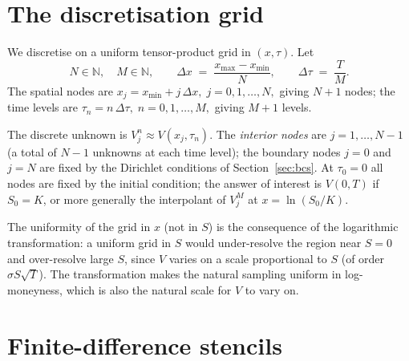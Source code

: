 \documentclass[11pt,a4paper]{article}
\begin{document}
\section{The discretisation grid}

We discretise on a uniform tensor-product grid in $(x, \tau)$. Let
\begin{equation}
N \in \mathbb{N},\quad M \in \mathbb{N},\qquad
\Delta x \;=\; \frac{x_{\max} - x_{\min}}{N},\qquad
\Delta \tau \;=\; \frac{T}{M}.
\label{eq:grid-spacing}
\end{equation}
The spatial nodes are
\(
x_j = x_{\min} + j\,\Delta x,\; j = 0, 1, \dots, N,
\)
giving $N+1$ nodes; the time levels are
\(
\tau_n = n\,\Delta \tau,\; n = 0, 1, \dots, M,
\)
giving $M+1$ levels.

The discrete unknown is $V_j^n \approx V(x_j, \tau_n)$. The
\emph{interior nodes} are $j = 1, \dots, N-1$ (a total of $N-1$
unknowns at each time level); the boundary nodes $j = 0$ and $j = N$
are fixed by the Dirichlet conditions of Section~\ref{sec:bcs}. At
$\tau_0 = 0$ all nodes are fixed by the initial condition; the answer
of interest is $V(0, T)$ if $S_0 = K$, or more generally the
interpolant of $V_j^M$ at $x = \ln(S_0/K)$.

The uniformity of the grid in $x$ (not in $S$) is the consequence of
the logarithmic transformation: a uniform grid in $S$ would
under-resolve the region near $S = 0$ and over-resolve large $S$,
since $V$ varies on a scale proportional to $S$ (of order
$\sigma S\sqrt{T}$).
The transformation makes the natural sampling uniform in
log-moneyness, which is also the natural scale for $V$ to vary on.

\section{Finite-difference stencils}
\end{document}
